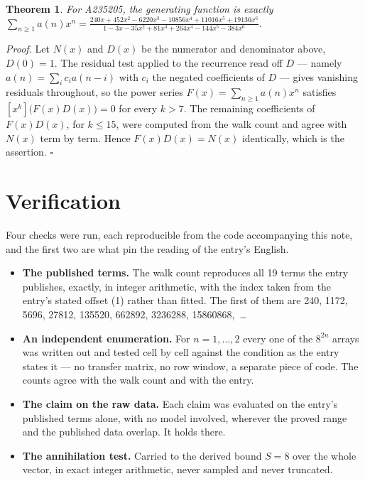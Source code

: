 \documentclass[11pt]{article}
\newtheorem{theorem}{Theorem}
\theoremstyle{definition}
\begin{document}
\begin{theorem} For A235205, the generating function is exactly $\sum_{n\ge 1} a(n)x^n = \frac{240x + 452x^{2} - 6220x^{3} - 10856x^{4} + 11016x^{5} + 19136x^{6}}{1 - 3x - 35x^{2} + 81x^{3} + 264x^{4} - 144x^{5} - 384x^{6}}$.\end{theorem}

{\itshape Proof.} Let $N(x)$ and $D(x)$ be the numerator and denominator above, $D(0)=1$. The residual test applied to the recurrence read off $D$ --- namely $a(n) = \sum_i c_i a(n-i)$ with $c_i$ the negated coefficients of $D$ --- gives vanishing residuals throughout, so the power series $F(x)=\sum_{n\ge 1}a(n)x^n$ satisfies $[x^k]\bigl(F(x)D(x)\bigr) = 0$ for every $k > 7$. The remaining coefficients of $F(x)D(x)$, for $k \le 15$, were computed from the walk count and agree with $N(x)$ term by term. Hence $F(x)D(x) = N(x)$ identically, which is the assertion. $\square$

\section{Verification}

Four checks were run, each reproducible from the code accompanying this note, and the first two are what pin the reading of the entry's English.

\begin{itemize}

\item {\bfseries The published terms.} The walk count reproduces all 19 terms the entry publishes, exactly, in integer arithmetic, with the index taken from the entry's stated offset (1) rather than fitted. The first of them are 240, 1172, 5696, 27812, 135520, 662892, 3236288, 15860868,~\dots

\item {\bfseries An independent enumeration.} For $n = 1,\dots,2$ every one of the $8^{2n}$ arrays was written out and tested cell by cell against the condition as the entry states it --- no transfer matrix, no row window, a separate piece of code. The counts agree with the walk count and with the entry.

\item {\bfseries The claim on the raw data.} Each claim was evaluated on the entry's published terms alone, with no model involved, wherever the proved range and the published data overlap. It holds there.

\item {\bfseries The annihilation test.} Carried to the derived bound $S = 8$ over the whole vector, in exact integer arithmetic, never sampled and never truncated.

\end{itemize}
\end{document}
